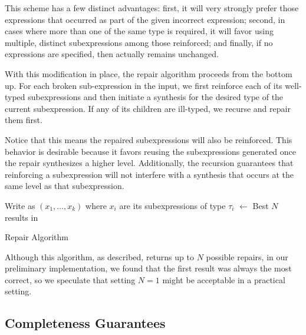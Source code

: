 This scheme has a few distinct advantages: first, it will very
strongly prefer those expressions that occurred as part of the given
incorrect expression; second, in cases where more than one of the same
type is required, it will favor using multiple, distinct
subexpressions among those reinforced; and finally, if no
expressions are specified, then \Cost actually remains unchanged.

With this modification in place, the repair algorithm proceeds from
the bottom up. For each broken sub-expression in the input, we first
reinforce each of its well-typed subexpressions and then initiate a
synthesis for the desired type of the current subexpression. If any of
its children are ill-typed, we recurse and repair them first.

Notice that this means the repaired subexpressions will also be
reinforced. This behavior is desirable because it favors reusing the
subexpressions generated once the repair synthesizes a higher
level. Additionally, the recursion guarantees that reinforcing a
subexpression will not interfere with a synthesis that occurs at the
same level as that subexpression.
\begin{algorithm}[ht]
\BlankLine
{}
Write \Expr as \Expr$(x_1, \ldots, x_k)$ where $x_i$ are its subexpressions of type $\tau_i$ \;
\Repairs $\longleftarrow$ Best $N$ results in \Repairs
\caption{Repair Algorithm}\label{proc:repair}
\end{algorithm}
Although this algorithm, as described, returns up to $N$ possible
repairs, in our preliminary implementation, we found that the first
result was always the most correct, so we speculate that setting $N=1$ might be
acceptable in a practical setting.

\iffalse

\subsection{Completeness Guarantees}

